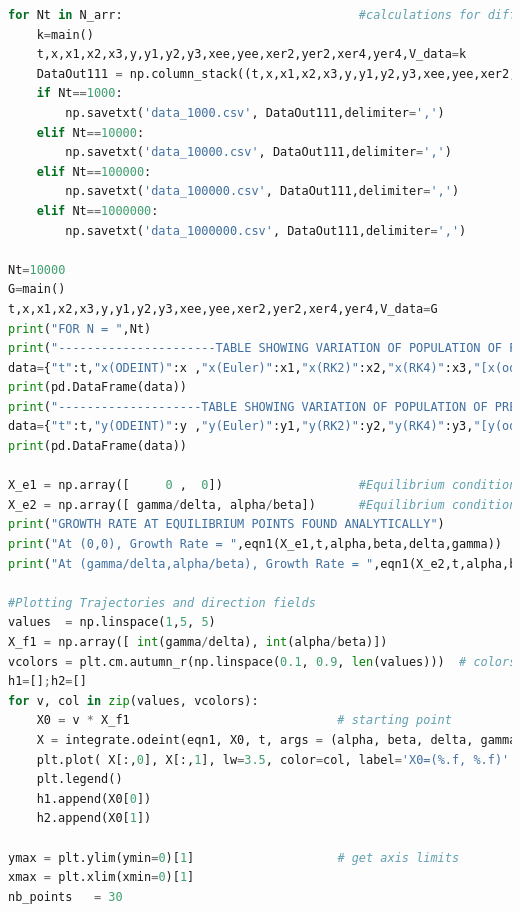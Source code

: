 \documentclass[12pt]{article}
\begin{document}
\begin{lstlisting}[language=Python, caption=Python example]
for Nt in N_arr:                                 #calculations for different N and storing values in csv files
    k=main()
    t,x,x1,x2,x3,y,y1,y2,y3,xee,yee,xer2,yer2,xer4,yer4,V_data=k
    DataOut111 = np.column_stack((t,x,x1,x2,x3,y,y1,y2,y3,xee,yee,xer2,yer2,xer4,yer4,V_data))
    if Nt==1000:
        np.savetxt('data_1000.csv', DataOut111,delimiter=',') 
    elif Nt==10000:
        np.savetxt('data_10000.csv', DataOut111,delimiter=',') 
    elif Nt==100000:
        np.savetxt('data_100000.csv', DataOut111,delimiter=',') 
    elif Nt==1000000:
        np.savetxt('data_1000000.csv', DataOut111,delimiter=',') 

Nt=10000
G=main()
t,x,x1,x2,x3,y,y1,y2,y3,xee,yee,xer2,yer2,xer4,yer4,V_data=G
print("FOR N = ",Nt)
print("----------------------TABLE SHOWING VARIATION OF POPULATION OF PREY(x) WITH TIME(t)-------------------------")
data={"t":t,"x(ODEINT)":x ,"x(Euler)":x1,"x(RK2)":x2,"x(RK4)":x3,"[x(odeint)-x(euler)]/x(odeint)":xee,"[x(odeint)-x(rk2)]/x(odeint)":xer2,"[x(odeint)-x(rk4)]/x(odeint)":xer4}
print(pd.DataFrame(data))
print("--------------------TABLE SHOWING VARIATION OF POPULATION OF PREDATOR(y) WITH TIME(t)-----------------------")
data={"t":t,"y(ODEINT)":y ,"y(Euler)":y1,"y(RK2)":y2,"y(RK4)":y3,"[y(odeint)-y(euler)]/y(odeint)":yee,"[y(odeint)-y(rk2)]/y(odeint)":yer2,"[y(odeint)-y(rk4)]/y(odeint)":yer4}
print(pd.DataFrame(data))

X_e1 = np.array([     0 ,  0])                   #Equilibrium condition 1
X_e2 = np.array([ gamma/delta, alpha/beta])      #Equilibrium condition 2                                   
print("GROWTH RATE AT EQUILIBRIUM POINTS FOUND ANALYTICALLY")
print("At (0,0), Growth Rate = ",eqn1(X_e1,t,alpha,beta,delta,gamma))
print("At (gamma/delta,alpha/beta), Growth Rate = ",eqn1(X_e2,t,alpha,beta,delta,gamma))

#Plotting Trajectories and direction fields
values  = np.linspace(1,5, 5)                          
X_f1 = np.array([ int(gamma/delta), int(alpha/beta)])
vcolors = plt.cm.autumn_r(np.linspace(0.1, 0.9, len(values)))  # colors for each trajectory
h1=[];h2=[]
for v, col in zip(values, vcolors):
    X0 = v * X_f1                             # starting point
    X = integrate.odeint(eqn1, X0, t, args = (alpha, beta, delta, gamma))     
    plt.plot( X[:,0], X[:,1], lw=3.5, color=col, label='X0=(%.f, %.f)' % ( X0[0], X0[1]) )
    plt.legend()
    h1.append(X0[0])
    h2.append(X0[1])

ymax = plt.ylim(ymin=0)[1]                    # get axis limits
xmax = plt.xlim(xmin=0)[1]
nb_points   = 30


\end{lstlisting}
\end{document}
